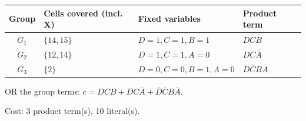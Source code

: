 \documentclass[a4paper,11pt]{article}
\begin{document}
\begin{minipage}{\textwidth}
\begin{center}\small
\begin{tabular}{clll}
\toprule
Group & Cells covered (incl. X) & Fixed variables & Product term\\\midrule
\textcolor{blue!75!black}{$G_{1}$} & $\{14,15\}$ & $D=1,C=1,B=1$ & $DCB$\\
\textcolor{red!75!black}{$G_{2}$} & $\{12,14\}$ & $D=1,C=1,A=0$ & $DC\overline{A}$\\
\textcolor{teal!80!black}{$G_{3}$} & $\{2\}$ & $D=0,C=0,B=1,A=0$ & $\overline{D}\overline{C}B\overline{A}$\\
\bottomrule\end{tabular}\end{center}


\noindent OR the group terms: $\boxed{c=DCB + DC\overline{A} + \overline{D}\overline{C}B\overline{A}}$.

\noindent Cost: 3 product term(s), 10 literal(s).

\end{minipage}\par\vspace{0.25cm}
\end{document}
